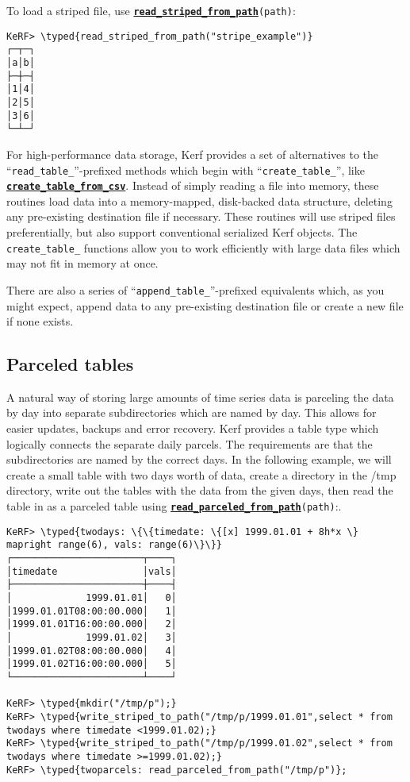 \documentclass{article}
\newcommand{\typed}[1]{\textcolor{TealBlue}{#1}}
\newcommand{\primu}[2]{\hyperref[prim:#2]{\textbf{\texttt{#1}}}}
\begin{document}
To load a striped file, use \primu{read\_striped\_from\_path}{readStripedFromPath}\texttt{(path)}:
\begin{Verbatim}
KeRF> \typed{read_striped_from_path("stripe_example")}
┌─┬─┐
│a│b│
├─┼─┤
│1│4│
│2│5│
│3│6│
└─┴─┘
\end{Verbatim}

For high-performance data storage, Kerf provides a set of alternatives to the ``\texttt{read\_table\_}''-prefixed methods which begin with ``\texttt{create\_table\_}'', like \primu{create\_table\_from\_csv}{createTableFromCsv}. Instead of simply reading a file into memory, these routines load data into a memory-mapped, disk-backed data structure, deleting any pre-existing destination file if necessary. These routines will use striped files preferentially, but also support conventional serialized Kerf objects. The \texttt{create\_table\_} functions allow you to work efficiently with large data files which may not fit in memory at once.

\vspace{0.5cm}

There are also a series of ``\texttt{append\_table\_}''-prefixed equivalents which, as you might expect, append data to any pre-existing destination file or create a new file if none exists.

\pagebreak
\subsection{Parceled tables}\label{sec:parcels}
A natural way of storing large amounts of time series data is parceling the data by day into separate subdirectories which are named by day. This allows for easier updates, backups and error recovery. Kerf provides a table type which logically connects the separate daily parcels. The requirements are that the subdirectories are named by the correct days. In the following example, we will create a small table with two days worth of data, create a directory in the /tmp directory, write out the tables with the data from the given days, then read the table in as a parceled table using \primu{read\_parceled\_from\_path}{readParceledFromPath}\texttt{(path)}:.

\begin{Verbatim}
KeRF> \typed{twodays: \{\{timedate: \{[x] 1999.01.01 + 8h*x \} mapright range(6), vals: range(6)\}\}}
┌───────────────────────┬────┐
│timedate               │vals│
├───────────────────────┼────┤
│             1999.01.01│   0│
│1999.01.01T08:00:00.000│   1│
│1999.01.01T16:00:00.000│   2│
│             1999.01.02│   3│
│1999.01.02T08:00:00.000│   4│
│1999.01.02T16:00:00.000│   5│
└───────────────────────┴────┘

KeRF> \typed{mkdir("/tmp/p");}
KeRF> \typed{write_striped_to_path("/tmp/p/1999.01.01",select * from twodays where timedate <1999.01.02);}
KeRF> \typed{write_striped_to_path("/tmp/p/1999.01.02",select * from twodays where timedate >=1999.01.02);}
KeRF> \typed{twoparcels: read_parceled_from_path("/tmp/p")};

\end{Verbatim}
\end{document}
